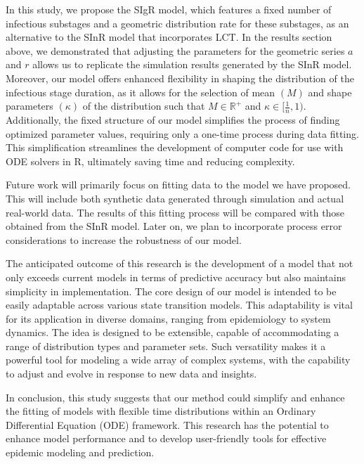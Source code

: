 \documentclass[12pt]{article}
\begin{document}
In this study, we propose the SIgR model, which features a fixed number of infectious substages and a geometric distribution rate for these substages, as an alternative to the SInR model that incorporates LCT. In the results section above, we demonstrated that adjusting the parameters for the geometric series $a$ and $r$ allows us to replicate the simulation results generated by the SInR model. Moreover, our model offers enhanced flexibility in shaping the distribution of the infectious stage duration, as it allows for the selection of mean $(M)$ and shape parameters $(\kappa)$ of the distribution such that $M \in \mathbb{R}^+$ and $\kappa \in [\frac{1}{n}, 1)$. Additionally, the fixed structure of our model simplifies the process of finding optimized parameter values, requiring only a one-time process during data fitting. This simplification streamlines the development of computer code for use with ODE solvers in R, ultimately saving time and reducing complexity.

Future work will primarily focus on fitting data to the model we have proposed. This will include both synthetic data generated through simulation and actual real-world data. The results of this fitting process will be compared with those obtained from the SInR model. Later on, we plan to incorporate process error considerations to increase the robustness of our model.

The anticipated outcome of this research is the development of a model that not only exceeds current models in terms of predictive accuracy but also maintains simplicity in implementation. The core design of our model is intended to be easily adaptable across various state transition models. This adaptability is vital for its application in diverse domains, ranging from epidemiology to system dynamics. The idea is designed to be extensible, capable of accommodating a range of distribution types and parameter sets. Such versatility makes it a powerful tool for modeling a wide array of complex systems, with the capability to adjust and evolve in response to new data and insights.

In conclusion, this study suggests that our method could simplify and enhance the fitting of models with flexible time distributions within an Ordinary Differential Equation (ODE) framework. This research has the potential to enhance model performance and to develop user-friendly tools for effective epidemic modeling and prediction.




 
\end{document}
